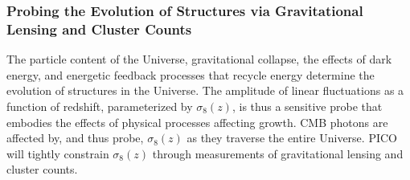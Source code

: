 \documentclass[PICOReport.tex]{subfiles}
\begin{document}
\subsubsection{Probing the Evolution of Structures via Gravitational Lensing and Cluster Counts} 
\label{sec:gravitationallensing}

The particle content of the Universe, gravitational collapse, the effects of dark energy, and energetic feedback processes that recycle energy determine the evolution of structures in the Universe. The amplitude of linear fluctuations as a function of redshift, parameterized by $\sigma_8(z)$, is thus a sensitive probe that embodies the effects of physical processes affecting growth. \ac{CMB} photons are affected by, and thus probe, $\sigma_{8}(z)$ as they traverse the entire Universe. PICO will tightly constrain $\sigma_8(z)$ through measurements of gravitational lensing and cluster counts. 
\end{document}
